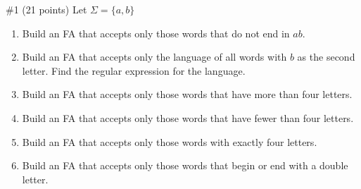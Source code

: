 \begin{problem}{\#1 (21 points)}
    Let \(\Sigma = \{a,b\}\)
    \begin{enumerate}[label=\textbf{\alph*)}]
        \item Build an FA that accepts only those words that do not end in \(ab\).
        \item Build an FA that accepts only the language of all words with \(b\) as the second letter.
        Find the regular expression for the language.
        \item Build an FA that accepts only those words that have more than four letters.
        \item Build an FA that accepts only those words that have fewer than four letters.
        \item Build an FA that accepts only those words with exactly four letters.
        \item Build an FA that accepts only those words that begin or end with a double letter.
    \end{enumerate}
\end{problem}
\vspace{2em}
